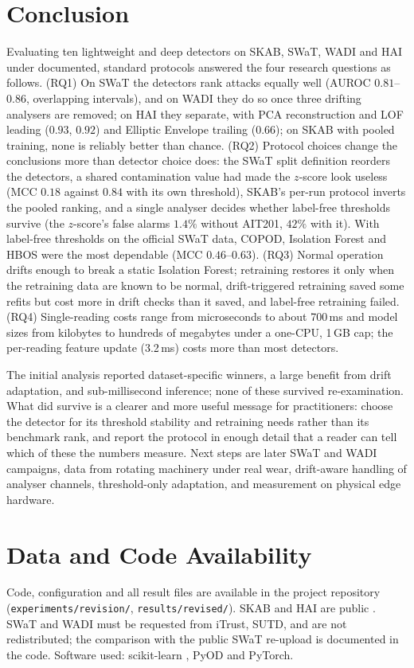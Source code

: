 \documentclass[11pt]{article}
\begin{document}
\section{Conclusion}
\label{sec:conclusion}

Evaluating ten lightweight and deep detectors on SKAB, SWaT, WADI and HAI under
documented, standard protocols answered the four research questions as follows.
(RQ1) On SWaT the detectors rank attacks equally well (AUROC $0.81$--$0.86$, overlapping
intervals), and on WADI they do so once three drifting analysers are removed; on HAI
they separate, with PCA reconstruction and LOF leading ($0.93$, $0.92$) and Elliptic
Envelope trailing ($0.66$); on SKAB with pooled training, none is reliably better than
chance. (RQ2) Protocol choices change the conclusions more than detector choice does:
the SWaT split definition reorders the detectors, a shared contamination value had made
the $z$-score look useless (MCC $0.18$ against $0.84$ with its own threshold), SKAB's
per-run protocol inverts the pooled ranking, and a single analyser decides whether
label-free thresholds survive (the $z$-score's false alarms $1.4\%$ without AIT201,
$42\%$ with it). With label-free thresholds on the official SWaT data, COPOD, Isolation
Forest and HBOS were the most dependable (MCC $0.46$--$0.63$). (RQ3) Normal operation drifts enough to break a static Isolation
Forest; retraining restores it only when the retraining data are known to be
normal, drift-triggered retraining saved some refits but
cost more in drift checks than it saved, and label-free retraining failed. (RQ4) Single-reading costs range from
microseconds to about 700\,ms and model sizes from kilobytes to hundreds of megabytes
under a one-CPU, 1\,GB cap; the per-reading feature update (3.2\,ms) costs more than
most detectors.

The initial analysis reported dataset-specific winners, a large
benefit from drift adaptation, and sub-millisecond inference; none of these
survived re-examination. What did survive is a clearer and more useful message for
practitioners: choose the detector for its threshold stability and retraining
needs rather than its benchmark rank, and report the protocol in enough detail
that a reader can tell which of these the numbers measure. Next steps are later SWaT
and WADI campaigns, data from rotating machinery under real wear, drift-aware
handling of analyser channels, threshold-only adaptation, and measurement on physical
edge hardware.

\section*{Data and Code Availability}
Code, configuration and all result files are available in the project repository
(\texttt{experiments/revision/}, \texttt{results/revised/}). SKAB and HAI are public
\citep{skab,shin2021}. SWaT and WADI must be requested from iTrust, SUTD, and are not
redistributed; the comparison with the public SWaT re-upload is documented in the code. Software used:
scikit-learn \citep{pedregosa2011}, PyOD \citep{zhao2019} and PyTorch.
\end{document}
